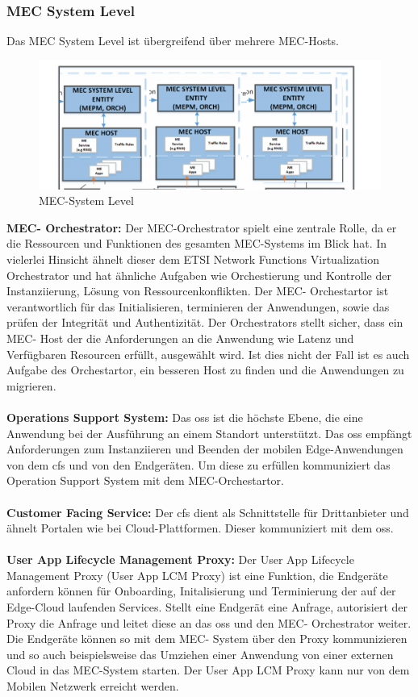 \documentclass[runningheads]{llncs}
\numberwithin{figure}{section}
\begin{document}
\subsubsection{MEC System Level}
Das MEC System Level ist übergreifend über mehrere MEC-Hosts. 
\begin{figure}
  \includegraphics[width=\linewidth]{images/mec-System-Level.png}
  \caption{MEC-System Level}
  \label{fig:mec-System-Level}
\end{figure}
\textbf{MEC- Orchestrator:}
Der MEC-Orchestrator spielt eine zentrale Rolle, 
da er die Ressourcen und Funktionen des gesamten MEC-Systems im Blick hat. 
In vielerlei Hinsicht ähnelt dieser dem ETSI Network Functions Virtualization Orchestrator und hat ähnliche 
Aufgaben wie Orchestierung und Kontrolle der Instanziierung, Lösung von Ressourcenkonflikten.
Der MEC- Orchestartor ist verantwortlich für das Initialisieren, terminieren der Anwendungen, sowie das prüfen
der Integrität und Authentizität. Der Orchestrators stellt sicher, 
dass ein MEC- Host der die Anforderungen an die Anwendung wie Latenz und Verfügbaren Resourcen erfüllt, ausgewählt wird.
Ist dies nicht der Fall ist es auch Aufgabe des Orchestartor, ein besseren Host zu finden und die Anwendungen zu migrieren.
\\
\\
\textbf{Operations Support System:}
Das \acrfull{oss} ist die höchste Ebene, die eine Anwendung bei der Ausführung an einem Standort unterstützt. 
Das \acrshort{oss} empfängt Anforderungen zum Instanziieren und Beenden der mobilen Edge-Anwendungen von dem \acrfull{cfs} und von den Endgeräten.
Um diese zu erfüllen kommuniziert das Operation Support System mit dem MEC-Orchestartor.
\\
\\
\textbf{Customer Facing Service:}
Der \acrfull{cfs} dient als Schnittstelle für Drittanbieter und ähnelt Portalen wie bei Cloud-Plattformen. 
Dieser kommuniziert mit dem \acrshort{oss}.
\\
\\
\textbf{User App Lifecycle Management Proxy:} 
Der User App Lifecycle Management Proxy (User App LCM Proxy) ist eine Funktion, die Endgeräte anfordern können für Onboarding, Initalisierung und Terminierung der auf der
Edge-Cloud laufenden Services. Stellt eine Endgerät eine Anfrage, autorisiert der Proxy die Anfrage und leitet diese an das \acrshort{oss} und den MEC- Orchestrator weiter. 
Die Endgeräte können so mit dem MEC- System über den Proxy kommunizieren und so auch beispielsweise das Umziehen einer Anwendung von 
einer externen Cloud in das MEC-System starten. Der User App LCM Proxy kann nur von dem Mobilen Netzwerk erreicht werden.
\end{document}
